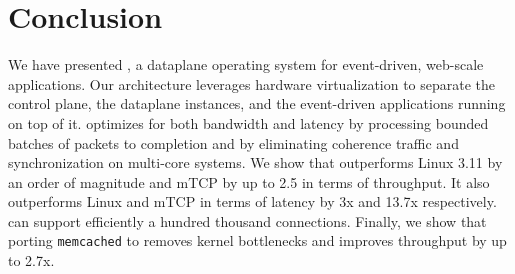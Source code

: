 
\section{Conclusion}

We have presented \ix, a dataplane operating system for event-driven,
web-scale applications.  Our architecture leverages hardware
virtualization to separate the control plane, the \ix dataplane
instances, and the event-driven applications running on top of it.
\ix optimizes for both bandwidth and latency by processing bounded
batches of packets to completion and by eliminating coherence traffic
and synchronization on multi-core systems. We show that \ix
outperforms Linux 3.11 by an order of magnitude and mTCP by up to 2.5
in terms of throughput. It also outperforms Linux and mTCP in terms of
latency by 3x and 13.7x respectively. \ix can support efficiently a
hundred thousand connections. Finally, we show that porting
\texttt{memcached} to \ix removes kernel bottlenecks and improves
throughput by up to 2.7x.


